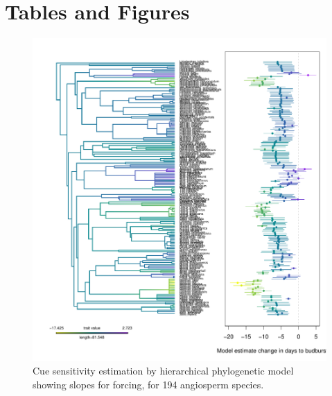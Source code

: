 \documentclass{article}\usepackage[]{graphicx}\usepackage[]{color}
\begin{document}
\section*{Tables and Figures} 


\begin{figure} [H]
  \begin{center}
  \includegraphics[width=14cm]{..//..//analyses/phylogeny/figures/muplot_phylo_force.pdf}
  \caption{Cue sensitivity estimation by hierarchical phylogenetic model showing slopes for forcing, for 194 angiosperm species.}
  \label{fig:muplot_force}
  \end{center}
\end{figure}
\end{document}
